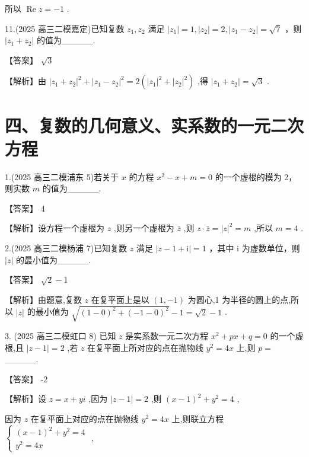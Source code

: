\documentclass[10pt]{article}
\begin{document}
所以 \(\operatorname{Re}z =  - 1\) .

11.(2025 高三二模嘉定)已知复数 \({z}_{1},{z}_{2}\) 满足 \(\left| {z}_{1}\right|  = 1,\left| {z}_{2}\right|  = 2,\left| {{z}_{1} - {z}_{2}}\right|  = \sqrt{7}\) ，则 \(\left| {{z}_{1} + {z}_{2}}\right|\) 的值为\_\_\_\_\_.

【答案】 \(\sqrt{3}\)

【解析】由 \({\left| {z}_{1} + {z}_{2}\right| }^{2} + {\left| {z}_{1} - {z}_{2}\right| }^{2} = 2\left( {{\left| {z}_{1}\right| }^{2} + {\left| {z}_{2}\right| }^{2}}\right)\) ,得 \(\left| {{z}_{1} + {z}_{2}}\right|  = \sqrt{3}\) .

\section*{四、复数的几何意义、实系数的一元二次方程}

1.(2025 高三二模浦东 5)若关于 \(x\) 的方程 \({x}^{2} - x + m = 0\) 的一个虚根的模为 2，则实数 \(m\) 的值为\_\_\_\_\_.

【答案】 4

【解析】设方程一个虚根为 \(z\) ,则另一个虚根为 \(\bar{z}\) ,则 \(z \cdot  \bar{z} = {\left| z\right| }^{2} = m\) ,所以 \(m = 4\) .

2.(2025 高三二模杨浦 7)已知复数 \(z\) 满足 \(\left| {z - 1 + \mathrm{i}}\right|  = 1\) ，其中 \(\mathrm{i}\) 为虚数单位，则 \(\left| z\right|\) 的最小值为\_\_\_\_\_.

【答案】 \(\sqrt{2} - 1\)

【解析】由题意,复数 \(z\) 在复平面上是以 \(\left( {1, - 1}\right)\) 为圆心,1 为半径的圆上的点,所以 \(\left| z\right|\) 的最小值为 \(\sqrt{{\left( 1 - 0\right) }^{2} + {\left( -1 - 0\right) }^{2}} - 1 = \sqrt{2} - 1\) .

3. (2025 高三二模虹口 8) 已知 \(z\) 是实系数一元二次方程 \({x}^{2} + {px} + q = 0\) 的一个虚根,且 \(\left| {z - 1}\right|  = 2\) ,若 \(z\) 在复平面上所对应的点在抛物线 \({y}^{2} = {4x}\) 上,则 \(p =\) \_\_\_\_\_.

【答案】 -2

【解析】设 \(z = x + {yi}\) ,因为 \(\left| {z - 1}\right|  = 2\) ,则 \({\left( x - 1\right) }^{2} + {y}^{2} = 4\) ,

因为 \(z\) 在复平面上对应的点在抛物线 \({y}^{2} = {4x}\) 上,则联立方程 \(\left\{  \begin{array}{l} {\left( x - 1\right) }^{2} + {y}^{2} = 4 \\  {y}^{2} = {4x} \end{array}\right.\) ,
\end{document}
